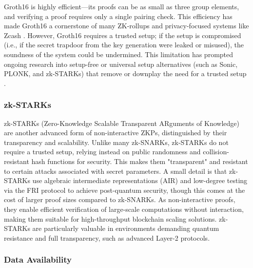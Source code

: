 \vspace{12pt}

Groth16 is highly efficient—its proofs can be as small as three group elements, and verifying a proof requires only a single pairing check. This efficiency has made Groth16 a cornerstone of many ZK-rollups and privacy-focused systems like Zcash \cite{Gro16}. However, Groth16 requires a trusted setup; if the setup is compromised (i.e., if the secret trapdoor from the key generation were leaked or misused), the soundness of the system could be undermined. This limitation has prompted ongoing research into setup-free or universal setup alternatives (such as Sonic, PLONK, and zk-STARKs) that remove or downplay the need for a trusted setup \cite{Ban25,BBHR18,GWC19,MBKM19,Hab25}.

\vspace{12pt}

\subsubsection{zk-STARKs}

\vspace{12pt}

zk-STARKs (Zero-Knowledge Scalable Transparent ARguments of Knowledge) are another advanced form of non-interactive ZKPs, distinguished by their transparency and scalability. Unlike many zk-SNARKs, zk-STARKs do not require a trusted setup, relying instead on public randomness and collision-resistant hash functions for security. This makes them "transparent" and resistant to certain attacks associated with secret parameters\cite{BBHR18}. A small detail is that zk-STARKs use algebraic intermediate representations (AIR) and low-degree testing via the FRI protocol to achieve post-quantum security, though this comes at the cost of larger proof sizes compared to zk-SNARKs\cite{chainlink}. As non-interactive proofs, they enable efficient verification of large-scale computations without interaction, making them suitable for high-throughput blockchain scaling solutions\cite{BBHR18}. zk-STARKs are particularly valuable in environments demanding quantum resistance and full transparency, such as advanced Layer-2 protocols\cite{chainlink}.

\vspace{12pt}

\subsubsection{Data Availability}

